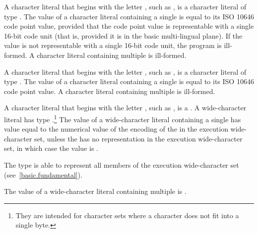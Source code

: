 \pnum
{}%
%
%
A character literal that
begins with the letter , such as ,
%
is a character literal of type . The value
of a  character literal containing a single  is
equal to its ISO 10646 code point value, provided that the code point value is
representable with a single 16-bit code unit (that is, provided it is in the
basic multi-lingual plane). If the value is not representable
with a single 16-bit code unit, the program is ill-formed. A  character literal
containing multiple  is ill-formed.

\pnum
{}%
%
%
A character literal that
begins with the letter , such as ,
%
is a character literal of type . The value of a
 character literal containing a single  is equal
to its ISO 10646 code point value. A  character literal containing
multiple  is ill-formed.

\pnum
{}%
%
%
%
A character literal that
begins with the letter , such as ,
%
is a . A wide-character literal has type
.\footnote{They are intended for character sets where a character does
not fit into a single byte. }
The value of a wide-character literal containing a single
 has value equal to the numerical value of the encoding
of the  in the execution wide-character set, unless the
 has no representation in the execution wide-character set, in which
case the value is . \begin{note} The type  is able to
represent all members of the execution wide-character set (see~\ref{basic.fundamental}).
\end{note} The value
of a wide-character literal containing multiple  is
.

